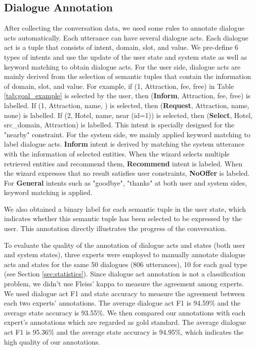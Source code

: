 \subsection{Dialogue Annotation}
After collecting the conversation data, we used some rules to annotate dialogue acts automatically. Each utterance can have several dialogue acts. Each dialogue act is a tuple that consists of intent, domain, slot, and value. We pre-define 6 types of intents and use the update of the user state and system state as well as keyword matching to obtain dialogue acts. 
For the user side, dialogue acts are mainly derived from the selection of semantic tuples that contain the information of domain, slot, and value. For example, if (1, Attraction, fee, free) in Table \ref{tab:goal_example} is selected by the user, then (\textbf{Inform}, Attraction, fee, free) is labelled. If (1, Attraction, name, \underline{\quad}) is selected, then (\textbf{Request}, Attraction, name, none) is labelled. If (2, Hotel, name, near (id=1)) is selected, then (\textbf{Select}, Hotel, src\_domain, Attraction) is labelled. This intent is specially designed for the "nearby" constraint. For the system side, we mainly applied keyword matching to label dialogue acts. \textbf{Inform} intent is derived by matching the system utterance with the information of selected entities. When the wizard selects multiple retrieved entities and recommend them, \textbf{Recommend} intent is labeled. When the wizard expresses that no result satisfies user constraints, \textbf{NoOffer} is labeled. For \textbf{General} intents such as "goodbye", "thanks" at both user and system sides, keyword matching is applied.

We also obtained a binary label for each semantic tuple in the user state, which indicates whether this semantic tuple has been selected to be expressed by the user. This annotation directly illustrates the progress of the conversation.

To evaluate the quality of the annotation of dialogue acts and states (both user and system states), three experts were employed to manually annotate dialogue acts and states for the same 50 dialogues (806 utterances), 10 for each goal type (see Section \ref{sec:statistics}). 
Since dialogue act annotation is not a classification problem, we didn't use Fleiss' kappa to measure the agreement among experts.
We used dialogue act F1 and state accuracy to measure the agreement between each two experts' annotations. The average dialogue act F1 is 94.59\% and the average state accuracy is 93.55\%.
We then compared our annotations with each expert's annotations which are regarded as gold standard. The average dialogue act F1 is 95.36\% and the average state accuracy is 94.95\%, which indicates the high quality of our annotations.

